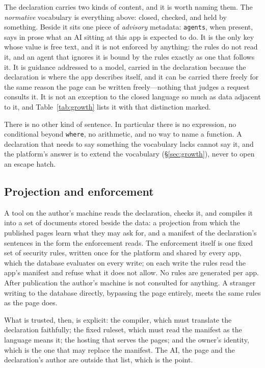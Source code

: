 \documentclass[11pt]{article}
\begin{document}
The declaration carries two kinds of content, and it is worth naming them. The \emph{normative} vocabulary is everything above: closed, checked, and held by something. Beside it sits one piece of \emph{advisory} metadata: \texttt{agents}, when present, says in prose what an AI sitting at this app is expected to do. It is the only key whose value is free text, and it is not enforced by anything: the rules do not read it, and an agent that ignores it is bound by the rules exactly as one that follows it. It is guidance addressed to a model, carried in the declaration because the declaration is where the app describes itself, and it can be carried there freely for the same reason the page can be written freely---nothing that judges a request consults it. It is not an exception to the closed language so much as data adjacent to it, and Table~\ref{tab:growth} lists it with that distinction marked.

There is no other kind of sentence. In particular there is no expression, no conditional beyond \texttt{where}, no arithmetic, and no way to name a function. A declaration that needs to say something the vocabulary lacks cannot say it, and the platform's answer is to extend the vocabulary (\S\ref{sec:growth}), never to open an escape hatch.

\subsection{Projection and enforcement}
\label{sec:projection}

A tool on the author's machine reads the declaration, checks it, and compiles it into a set of documents stored beside the data: a projection from which the published pages learn what they may ask for, and a manifest of the declaration's sentences in the form the enforcement reads. The enforcement itself is one fixed set of security rules, written once for the platform and shared by every app, which the database evaluates on every write; on each write the rules read the app's manifest and refuse what it does not allow. No rules are generated per app. After publication the author's machine is not consulted for anything. A stranger writing to the database directly, bypassing the page entirely, meets the same rules as the page does.

What is trusted, then, is explicit: the compiler, which must translate the declaration faithfully; the fixed ruleset, which must read the manifest as the language means it; the hosting that serves the pages; and the owner's identity, which is the one that may replace the manifest. The AI, the page and the declaration's author are outside that list, which is the point.
\end{document}
